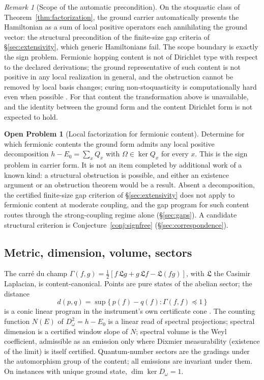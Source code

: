 \documentclass[11pt]{article}
\theoremstyle{definition}
\newtheorem{openproblem}[theorem]{Open Problem}
\theoremstyle{remark}
\newtheorem{remark}[theorem]{Remark}
\begin{document}
\begin{remark}[Scope of the automatic precondition]\label{rem:scope}
On the stoquastic class of Theorem~\ref{thm:factorization}, the ground
carrier automatically presents the Hamiltonian as a sum of local
positive operators each annihilating the ground vector: the structural
precondition of the finite-size gap criteria of
\S\ref{sec:extensivity}, which generic Hamiltonians fail.  The scope
boundary is exactly the sign problem.  Fermionic hopping content is not
of Dirichlet type with respect to the declared derivations; the ground
representative of such content is not positive in any local realization
in general, and the obstruction cannot be removed by local basis
changes; curing non-stoquasticity is computationally hard even when
possible \cite{bdot,mlh}.  For that content the transformation above is
unavailable, and the identity between the ground form and the content
Dirichlet form is not expected to hold.
\end{remark}

\begin{openproblem}[Local factorization for fermionic content]
\label{op:sign}
Determine for which fermionic contents the ground form admits any local
positive decomposition $h - E_0 = \sum_x Q_x$ with $\Omega \in \ker Q_x$
for every $x$.  This is the sign problem in carrier form.  It is not an
item completed by additional work of a known kind: a structural
obstruction is possible, and either an existence argument or an
obstruction theorem would be a result.  Absent a decomposition, the
certified finite-size gap criterion of \S\ref{sec:extensivity} does not
apply to fermionic content at moderate coupling, and the gap program for
such content routes through the strong-coupling regime alone
(\S\ref{sec:gaps}).  A candidate structural criterion is
Conjecture~\ref{conj:signfree} (\S\ref{sec:correspondence}).
\end{openproblem}

\subsection{Metric, dimension, volume, sectors}\label{sec:metricdim}
The carr\'e du champ $\Gamma(f,g) = \tfrac12[f\,\mathfrak L g + g\,
\mathfrak L f - \mathfrak L(fg)]$, with $\mathfrak L$ the Casimir
Laplacian, is content-canonical.  Points are pure states of the abelian
sector; the distance
\[
d(p,q) = \sup\{\,p(f) - q(f) : \Gamma(f,f) \preceq 1\,\}
\]
is a conic linear program in the instrument's own certificate cone
\cite{connes}.  The counting function $N(E)$ of $D_\omega^2 = h - E_0$
is a linear read of spectral projections; spectral dimension is a
certified window slope of $N$; spectral volume is the Weyl coefficient,
admissible as an emission only where Dixmier measurability (existence of
the limit) is itself certified.  Quantum-number sectors are the gradings
under the automorphism group of the content; all emissions are invariant
under them.  On instances with unique ground state, $\dim\ker D_\omega =
1$.
\end{document}
